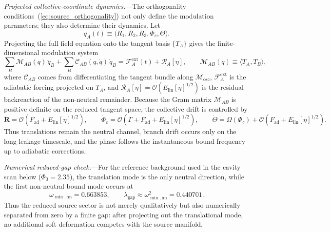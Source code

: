 \documentclass[aps,prd,onecolumn,superscriptaddress,nofootinbib,showpacs,12pt,notitlepage]{revtex4-2}
\renewcommand{\order}[1]{\mathcal{O}\!\left(#1\right)}
\begin{document}
\textit{Projected collective-coordinate dynamics.}---The
orthogonality conditions~(\ref{eq:source_orthogonality}) not only
define the modulation parameters; they also determine their dynamics.
Let
\begin{equation}\label{eq:collective_coordinate_set}
  q_A(t) \equiv \bigl(R_1,R_2,R_3,\Phi_c,\Theta\bigr).
\end{equation}
Projecting the full field equation onto the tangent basis
$\{T_A\}$ gives the finite-dimensional modulation system
\begin{equation}\label{eq:projected_modulation_system}
  \sum_B \mathcal{M}_{AB}(q)\,\ddot q_B
  + \sum_B \mathcal{C}_{AB}(q,\dot q)\,\dot q_B
  = \mathcal{F}^{\mathrm{ext}}_A(t) + \mathcal{R}_A[\eta],
  \qquad
  \mathcal{M}_{AB}(q) \equiv \langle T_A,T_B\rangle,
\end{equation}
where $\mathcal{C}_{AB}$ comes from differentiating the tangent
bundle along $\mathcal{M}_{\mathrm{osc}}$,
$\mathcal{F}^{\mathrm{ext}}_A$ is the adiabatic forcing projected on
$T_A$, and $\mathcal{R}_A[\eta] = \order{E_{\mathrm{lin}}[\eta]^{1/2}}$
is the residual backreaction of the non-neutral remainder.  Because
the Gram matrix $\mathcal{M}_{AB}$ is positive definite on the
reduced tangent space, the collective drift is controlled by
\begin{equation}\label{eq:collective_coordinate_scaling}
  \ddot{\mathbf{R}}
  = \order{F_{\mathrm{ad}} + E_{\mathrm{lin}}[\eta]^{1/2}},\qquad
  \dot{\Phi}_c
  = \order{\Gamma + F_{\mathrm{ad}} + E_{\mathrm{lin}}[\eta]^{1/2}},\qquad
  \dot{\Theta}
  = \Omega(\Phi_c) + \order{F_{\mathrm{ad}} + E_{\mathrm{lin}}[\eta]^{1/2}}.
\end{equation}
Thus translations remain the neutral channel, branch drift occurs only
on the long leakage timescale, and the phase follows the instantaneous
bound frequency up to adiabatic corrections.

\textit{Numerical reduced-gap check.}---For the reference
background used in the cavity scan below ($\Phi_0 = 2.35$), the
translation mode is the only neutral direction, while the first
non-neutral bound mode occurs at
\begin{equation}\label{eq:reduced_gap_numeric}
  \omega_{\min,\mathrm{nn}} = 0.663853,
  \qquad
  \lambda_{\mathrm{gap}}
  \approx \omega_{\min,\mathrm{nn}}^2
  = 0.440701.
\end{equation}
Thus the reduced source sector is not merely qualitatively but also
numerically separated from zero by a finite gap: after projecting out
the translational mode, no additional soft deformation competes with
the source manifold.
\end{document}
